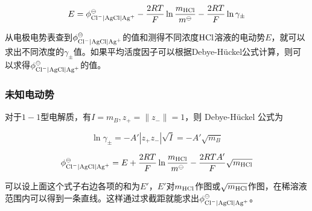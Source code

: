 \begin{equation*}
    E = \phi^\ominus_{\ce{Cl-} | \ce{AgCl} | \ce{Ag+}} - \frac{2RT}{F} \ln \frac{m_{\ce{HCl}}}{m^\ominus} - \frac{2RT}{F} \ln \gamma_\pm
\end{equation*}

从电极电势表查到$\phi^\ominus_{\ce{Cl-} | \ce{AgCl} | \ce{Ag+}}$的值和测得不同浓度$\ce{HCl}$溶液的电动势$E$，就可以求出不同浓度的$\gamma_\pm$值。如果平均活度因子可以根据Debye-Hückel公式计算，则可以求得$\phi^\ominus_{\ce{Cl-} | \ce{AgCl} | \ce{Ag+}}$的值。

\subsubsection{未知电动势}

对于$1 - 1$型电解质，有$I = m_B, z_+ = \| z_- \| = 1$，则 Debye-Hückel 公式为

\begin{equation*}
    \ln \gamma_\pm = - A' \left\lvert z_+ z_- \right\rvert \sqrt{I} = -A' \sqrt{m_B}
\end{equation*}


\begin{equation*}
    \phi^\ominus_{\ce{Cl-} | \ce{AgCl} | \ce{Ag+}} = E + \frac{2RT}{F} \ln \frac{m_{\ce{HCl}}}{m^\ominus} - \frac{2RTA'}{F} \sqrt{m_{\ce{HCl}}}
\end{equation*}

可以设上面这个式子右边各项的和为$E'$，$E'$对$m_{\ce{HCl}}$作图或$\sqrt{m_{\ce{HCl}}}$作图，在稀溶液范围内可以得到一条直线。这样通过求截距就能求出$\phi^\ominus_{\ce{Cl-} | \ce{AgCl} | \ce{Ag+}}$。
